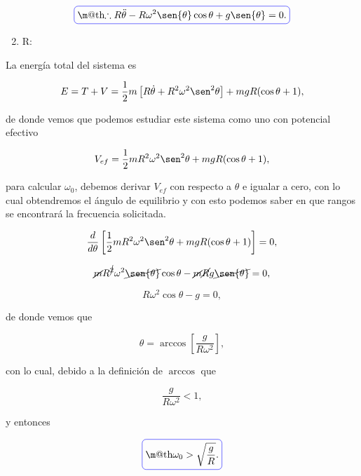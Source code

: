 \documentclass[a4paper,10pt]{article}
\makeatletter
\numberwithin{equation}{section}
\newcommand*{\boxcolor}{blue}
\renewcommand{\boxed}[1]{\textcolor{\boxcolor}{%
\tikz[baseline={([yshift=-1ex]current bounding box.center)}] \node [rectangle, minimum width=1ex,rounded corners,draw] {\normalcolor\m@th$\displaystyle#1$};}}
\makeatother
\begin{document}
\begin{equation}
 \boxed{\therefore R\ddot{\theta} - R\omega^2\sen{\theta}\cos{\theta} + g\sen{\theta}
 = 0.}
\end{equation}

\begin{enumerate}[label=\alph*)]
\setcounter{enumi}{1}
 \item R:
\end{enumerate}

La energía total del sistema es 

\begin{equation}
 E = T + V =  \frac{1}{2}m\left[R\dot{\theta} + R^2\omega^2\sen^2{\theta} \right] 
 +  mgR(\cos{\theta} + 1),
\end{equation}

de donde vemos que podemos estudiar este sistema como uno con potencial efectivo 

\begin{equation}
 V_{ef} =  \frac{1}{2}mR^2\omega^2\sen^2{\theta}  +  mgR(\cos{\theta} + 1),
\end{equation}

para calcular $\omega_0$, debemos derivar $V_{ef}$ con respecto a $\theta$ e 
igualar a cero, con lo cual obtendremos el ángulo de equilibrio y con esto 
podemos saber en que rangos se encontrará la frecuencia solicitada.

\begin{equation}
 \frac{d}{d\theta} \left[\frac{1}{2}mR^2\omega^2\sen^2{\theta} + 
 mgR(\cos{\theta} + 1) \right] = 0,
\end{equation}

\begin{equation}
 \cancel{m}R^{\cancel{2}}\omega^2\cancel{\sen{\theta}}\cos{\theta} - \cancel{m}\cancel{R} 
 g\cancel{\sen{\theta}} = 0,
\end{equation}

\begin{equation}
 R\omega^2\cos{\theta} - g = 0,
\end{equation}

de donde vemos que 

\begin{equation}
 \theta = \arccos{\left[\frac{g}{R\omega^2}\right]},
\end{equation}

con lo cual, debido a la definición de $\arccos$ que 

\begin{equation}
 \frac{g}{R\omega^2} < 1,
\end{equation}

y entonces 

\begin{equation}
 \boxed{\omega_0 > \sqrt{\frac{g}{R}}.}
\end{equation}
\end{document}
